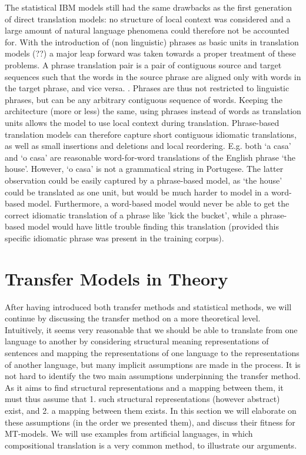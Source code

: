 \documentclass{report}
\theoremstyle{definition}
\theoremstyle{plain}
\begin{document}
The statistical IBM models still had the same drawbacks as the first generation of direct translation models: no structure of local context was considered and a large amount of natural language phenomena could therefore not be accounted for. With the introduction of (non linguistic) phrases as basic units in translation models 
(\cite{wang1998grammar,och1999improved}??) a major leap forward was taken towards a proper treatment of these problems. A phrase translation pair is a pair of contiguous source and target sequences such that the words in the source phrase are aligned only with words in the target phrase, and vice versa. \citep{och2004alignment}. Phrases are thus not restricted to linguistic phrases, but can be any arbitrary contiguous sequence of words. Keeping the architecture (more or less) the same, using phrases instead of words as translation units allows the model to use local context during translation. Phrase-based translation models can therefore capture short contiguous idiomatic translations, as well as small insertions and deletions and local reordering. E.g. both `a casa' and `o casa' are reasonable word-for-word translations of the English phrase `the house'. However, `o casa' is not a grammatical string in Portugese. The latter observation could be easily captured by a phrase-based model, as `the house' could be translated as one unit, but would be much harder to model in a word-based model. Furthermore, a word-based model would never be able to get the correct idiomatic translation of a phrase like 'kick the bucket', while a phrase-based model would have little trouble finding this translation (provided this specific idiomatic phrase was present in the training corpus).


\section{Transfer Models in Theory}
\label{sec:theory}

After having introduced both transfer methods and statistical methods, we will continue by discussing the transfer method on a more theoretical level. Intuitively, it seems very reasonable that we should be able to translate from one language to another by considering structural meaning representations of sentences and mapping the representations of one language to the representations of another language, but many implicit assumptions are made in the process. It is not hard to identify the two main assumptions underpinning the transfer method. As it aims to find structural representations and a mapping between them, it must thus assume that 1. such structural representations (however abstract) exist, and 2. a mapping between them exists. In this section we will elaborate on these assumptions (in the order we presented them), and discuss their fitness for MT-models. We will use examples from artificial languages, in which compositional translation is a very common method, to illustrate our arguments.
\end{document}

